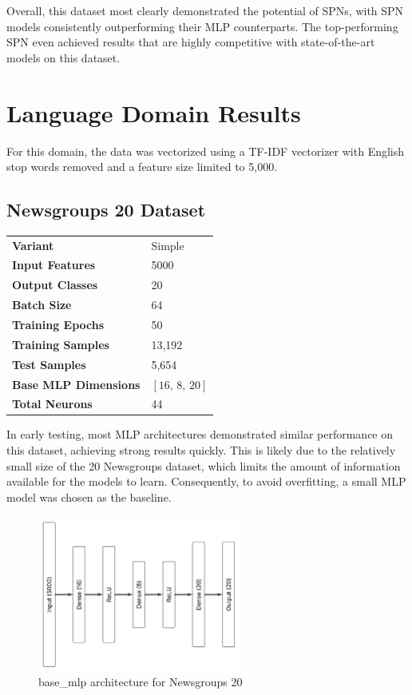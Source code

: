 Overall, this dataset most clearly demonstrated the potential of SPNs, with SPN models consistently outperforming their MLP counterparts. The top-performing SPN even achieved results that are highly competitive with state-of-the-art models on this dataset.

\section{Language Domain Results}

For this domain, the data was vectorized using a TF-IDF vectorizer with English stop words removed and a feature size limited to 5,000.

\subsection{Newsgroups 20 Dataset}

\begin{tabular}{@{}ll@{}}
\textbf{Variant} & Simple \\
\textbf{Input Features} & 5000 \\
\textbf{Output Classes} & 20 \\
\textbf{Batch Size} & 64 \\
\textbf{Training Epochs} & 50 \\
\textbf{Training Samples} & 13,192 \\
\textbf{Test Samples} & 5,654 \\
\textbf{Base MLP Dimensions} & $[16,\, 8,\, 20]$ \\
\textbf{Total Neurons} & 44 \\
\end{tabular}

\vspace{2pt}
In early testing, most MLP architectures demonstrated similar performance on this dataset, achieving strong results quickly. This is likely due to the relatively small size of the 20 Newsgroups dataset, which limits the amount of information available for the models to learn. Consequently, to avoid overfitting, a small MLP model was chosen as the baseline.

\begin{figure}[H]
    \centering
    \includegraphics[height=0.28\textheight,width=0.6\textwidth]{Figures/Results/Newsgroups/Newsgroups_base_mlp_architecture.png} 
    \captionsetup{justification=centering}  %
    \caption{base\_mlp architecture for Newsgroups 20}
    \label{fig:newsgroupsMlpBaseArch}
\end{figure}

